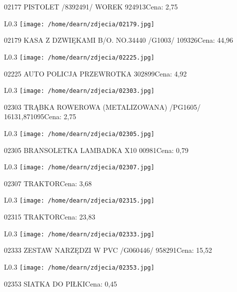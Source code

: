 02177 PISTOLET /8392491/  WOREK                       924913Cena: 2,75\newline
\begin{wrapfigure}{L}{0.3\textwidth}
\texttt{[image: /home/dearn/zdjecia/02179.jpg]}
\end{wrapfigure}
02179 KASA  Z DZWIĘKAMI B/O. NO.34440 /G1003/         109326Cena: 44,96\newline
\begin{wrapfigure}{L}{0.3\textwidth}
\texttt{[image: /home/dearn/zdjecia/02225.jpg]}
\end{wrapfigure}
02225 AUTO POLICJA PRZEWROTKA 302899Cena: 4,92\newline
\begin{wrapfigure}{L}{0.3\textwidth}
\texttt{[image: /home/dearn/zdjecia/02303.jpg]}
\end{wrapfigure}
02303 TRĄBKA ROWEROWA (METALIZOWANA) /PG1605/   16131,871095Cena: 2,75\newline
\begin{wrapfigure}{L}{0.3\textwidth}
\texttt{[image: /home/dearn/zdjecia/02305.jpg]}
\end{wrapfigure}
02305 BRANSOLETKA LAMBADKA  X10                       00981Cena: 0,79\newline
\begin{wrapfigure}{L}{0.3\textwidth}
\texttt{[image: /home/dearn/zdjecia/02307.jpg]}
\end{wrapfigure}
02307 TRAKTORCena: 3,68\newline
\begin{wrapfigure}{L}{0.3\textwidth}
\texttt{[image: /home/dearn/zdjecia/02315.jpg]}
\end{wrapfigure}
02315 TRAKTORCena: 23,83\newline
\begin{wrapfigure}{L}{0.3\textwidth}
\texttt{[image: /home/dearn/zdjecia/02333.jpg]}
\end{wrapfigure}
02333 ZESTAW NARZĘDZI  W PVC  /G060446/               958291Cena: 15,52\newline
\begin{wrapfigure}{L}{0.3\textwidth}
\texttt{[image: /home/dearn/zdjecia/02353.jpg]}
\end{wrapfigure}
02353 SIATKA DO PIŁKICena: 0,45\newline
